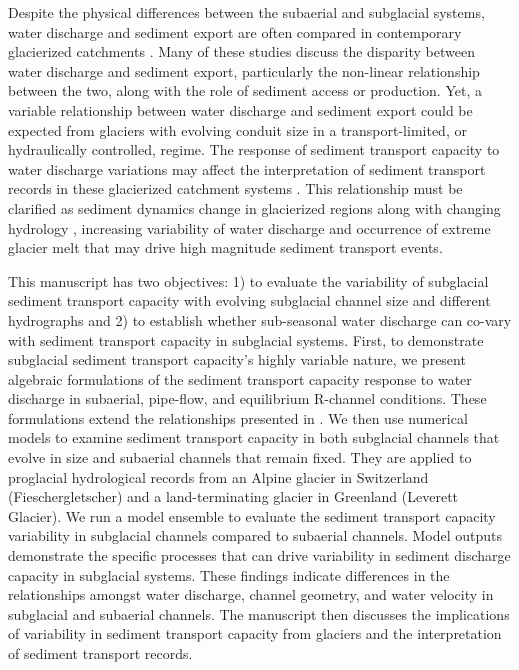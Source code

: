 \documentclass[esurf, manuscript]{copernicus}
\begin{document}
Despite the physical differences between the subaerial and subglacial systems, water discharge and sediment export are often compared in contemporary glacierized catchments \citep[e.g.][]{willis1996,hodson1998,pearce2003,richards2003,swift2005,chu2009,tedstone2012,chu2012,overeem2017,delaney2018,swift2021,lu2022,andresen2024}.
Many of these studies discuss the disparity between water discharge and sediment export, particularly the non-linear relationship between the two, along with the role of sediment access or production.
Yet, a variable relationship between water discharge and sediment export could be expected from glaciers with evolving conduit size in a transport-limited, or hydraulically controlled, regime.
The response of sediment transport capacity to water discharge variations may affect the interpretation of sediment transport records in these glacierized catchment systems \citep[e.g.][]{ganti2016,mancini2023}.
This relationship must be clarified as sediment dynamics change in glacierized regions along with changing hydrology \citep[e.g.][]{brunner2019}, increasing variability of water discharge \citep{lane2019} and occurrence of extreme glacier melt  \citep[e.g.][]{overeem2015,cremona2023} that may drive high magnitude sediment transport events.

This manuscript has two objectives: 1) to evaluate the variability of subglacial sediment transport capacity with evolving subglacial channel size and different hydrographs and 2) to establish whether sub-seasonal water discharge can co-vary with sediment transport capacity in subglacial systems.
First, to demonstrate subglacial sediment transport capacity's highly variable nature,  we present algebraic formulations of the sediment transport capacity response to water discharge in subaerial, pipe-flow, and equilibrium R-channel conditions.
These formulations extend the relationships presented in \citet{alley1997}.
We then use numerical models to examine sediment transport capacity in both subglacial channels that evolve in size and subaerial channels that remain fixed.
They are applied to proglacial hydrological records from an Alpine glacier in Switzerland (Fieschergletscher) and a land-terminating glacier in Greenland (Leverett Glacier).
We run a model ensemble to evaluate the sediment transport capacity variability in subglacial channels compared to subaerial channels.
Model outputs demonstrate the specific processes that can drive variability in sediment discharge capacity in subglacial systems.
These findings indicate differences in the relationships amongst water discharge, channel geometry, and water velocity in subglacial and subaerial channels.
The manuscript then discusses the implications of variability in sediment transport capacity from glaciers and the interpretation of sediment transport records.
\end{document}
